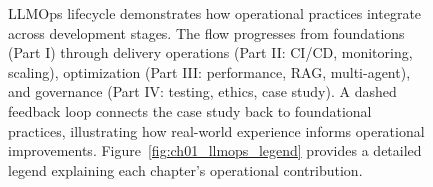 \begin{figure}[t]
\begin{llmfigbox}
\end{llmfigbox}
\renewcommand{\LLMFigMaxWidth}{1.15\linewidth}

\caption{LLMOps lifecycle demonstrates how operational practices integrate across development stages. The flow progresses from foundations (Part I) through delivery operations (Part II: CI/CD, monitoring, scaling), optimization (Part III: performance, RAG, multi-agent), and governance (Part IV: testing, ethics, case study). A dashed feedback loop connects the case study back to foundational practices, illustrating how real-world experience informs operational improvements. Figure~\ref{fig:ch01_llmops_legend} provides a detailed legend explaining each chapter's operational contribution.}
\label{fig:ch01_llmops_lifecycle}
\end{figure}


